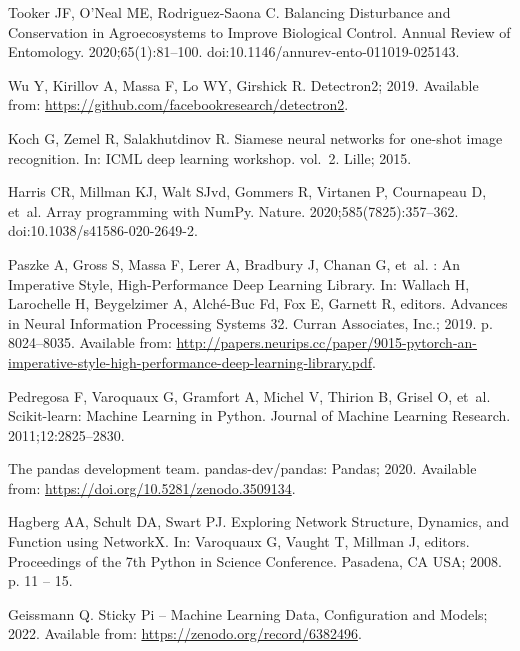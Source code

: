 \documentclass[12pt]{article}
\begin{document}
\begin{thebibliography}{10}
	Tooker JF, O'Neal ME, Rodriguez-Saona C.
	\newblock Balancing {Disturbance} and {Conservation} in {Agroecosystems} to
	{Improve} {Biological} {Control}.
	\newblock Annual Review of Entomology. 2020;65(1):81--100.
	\newblock doi:{10.1146/annurev-ento-011019-025143}.
	
	Wu Y, Kirillov A, Massa F, Lo WY, Girshick R. Detectron2; 2019.
	\newblock Available from: \url{https://github.com/facebookresearch/detectron2}.
	
	Koch G, Zemel R, Salakhutdinov R.
	\newblock Siamese neural networks for one-shot image recognition.
	\newblock In: {ICML} deep learning workshop. vol.~2. Lille; 2015.
	
	Harris CR, Millman KJ, Walt SJvd, Gommers R, Virtanen P, Cournapeau D, et~al.
	\newblock Array programming with {NumPy}.
	\newblock Nature. 2020;585(7825):357--362.
	\newblock doi:{10.1038/s41586-020-2649-2}.
	
	Paszke A, Gross S, Massa F, Lerer A, Bradbury J, Chanan G, et~al.
	: {An} {Imperative} {Style}, {High}-{Performance} {Deep}
	{Learning} {Library}.
	\newblock In: Wallach H, Larochelle H, Beygelzimer A, Alché-Buc Fd, Fox E,
	Garnett R, editors. Advances in {Neural} {Information} {Processing} {Systems}
	32. Curran Associates, Inc.; 2019. p. 8024--8035.
	\newblock Available from:
	\url{http://papers.neurips.cc/paper/9015-pytorch-an-imperative-style-high-performance-deep-learning-library.pdf}.
	
	Pedregosa F, Varoquaux G, Gramfort A, Michel V, Thirion B, Grisel O, et~al.
	\newblock Scikit-learn: {Machine} {Learning} in {Python}.
	\newblock Journal of Machine Learning Research. 2011;12:2825--2830.
	
	{The pandas development team}. pandas-dev/pandas: {Pandas}; 2020.
	\newblock Available from: \url{https://doi.org/10.5281/zenodo.3509134}.
	
	Hagberg AA, Schult DA, Swart PJ.
	\newblock Exploring {Network} {Structure}, {Dynamics}, and {Function} using
	{NetworkX}.
	\newblock In: Varoquaux G, Vaught T, Millman J, editors. Proceedings of the 7th
	{Python} in {Science} {Conference}. Pasadena, CA USA; 2008. p. 11 -- 15.
	
	Geissmann Q. Sticky {Pi} -- {Machine} {Learning} {Data}, {Configuration} and
	{Models}; 2022.
	\newblock Available from: \url{https://zenodo.org/record/6382496}.
	

\end{thebibliography}
\end{document}
